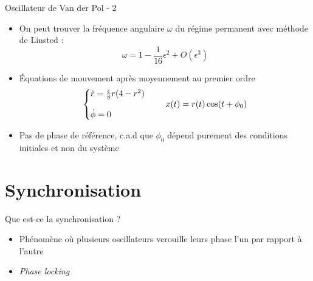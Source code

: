 \begin{frame}{Oscillateur de Van der Pol - 2}
    \begin{itemize}
      \item On peut trouver la fréquence angulaire $\omega$ du régime permanent avec méthode de Linsted \cite{rand_lecture_2012} :
      \[ \omega = 1 - \frac{1}{16}\epsilon^2 + O(\epsilon^3) \]
      \item Équations de mouvement après moyennement au premier ordre
      \begin{equation*}
        \left\{
        \begin{array}{@{}l@{}}
            \dot{r} = \frac{\epsilon}{8}r(4-r^2) \\
            \\
            \dot{\phi} = 0
        \end{array}
        \right.\,
        \qquad 
        x(t) = r(t)\cos(t+\phi_0)
      \end{equation*}
    \item Pas de phase de référence, c.a.d que $\phi_0$ dépend purement des conditions initiales et non du système
    \end{itemize}
  \end{frame}


\section{Synchronisation}
\begin{frame}{Que est-ce la synchronisation ?}
  \begin{itemize}
    \item Phénomène où plusieurs oscillateurs verouille leurs phase l'un par rapport à l'autre \cite{matheny_phase_2014}
    \item \emph{Phase locking}
  \end{itemize}
\end{frame}

